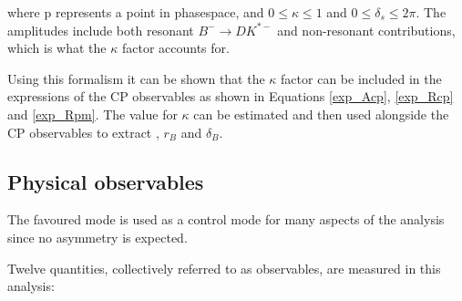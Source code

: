 where p represents a point in phasespace, and $0 \leq \kappa \leq 1$ and $0 \leq \delta_s \leq 2\pi$. The amplitudes include both resonant $B^- \to DK^{*-}$ and non-resonant contributions, which is what the $\kappa$ factor accounts for.

Using this formalism it can be shown that the $\kappa$ factor can be included in the expressions of the CP observables as shown in Equations \ref{exp_Acp}, \ref{exp_Rcp} and \ref{exp_Rpm}. The value for $\kappa$ can be estimated and then used alongside the CP observables to extract \Pgamma, $r_B$ and $\delta_B$.

\subsection{Physical observables}

The favoured mode is used  as a control mode for many aspects of the analysis since no \CP asymmetry is expected.

Twelve quantities, collectively referred to as \CP observables, are measured in this analysis:

